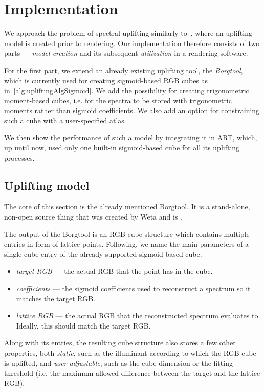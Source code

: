 \chapter{Implementation} \label{chap:implementation}

We approach the problem of spectral uplifting similarly to~\citet{upsamplingJakobHanika}, where an uplifting model is created prior to rendering. Our implementation therefore consists of two parts --- \emph{model creation} and its subsequent \emph{utilization} in a rendering software. 

For the first part, we extend an already existing uplifting tool, the \emph{Borgtool}, which is currently used for creating sigmoid-based RGB cubes as in~\cref{alg:upliftingAlgSigmoid}. We add the possibility for creating trigonometric moment-based cubes, i.e. for the spectra to be stored with trigonometric moments rather than sigmoid coefficients. We also add an option for constraining such a cube with a user-specified atlas.

We then show the performance of such a model by integrating it in ART, which, up until now, used only one built-in sigmoid-based cube for all its uplifting processes.

\section{Uplifting model}

The core of this section is the already mentioned Borgtool. It is a stand-alone, non-open source thing that was created by Weta and is .

The output of the Borgtool is an RGB cube structure which contains multiple entries in form of lattice points. Following, we name the main parameters of a single cube entry of the already supported sigmoid-based cube:
\begin{itemize}
	\item \emph{target RGB} --- the actual RGB that the point has in the cube.
	\item \emph{coefficients} --- the sigmoid coefficients used to reconstruct a spectrum so it matches the target RGB.
	\item \emph{lattice RGB} --- the actual RGB that the reconstructed spectrum evaluates to. Ideally, this should match the target RGB.
\end{itemize}
Along with its entries, the resulting cube structure also stores a few other properties, both \emph{static}, such as the illuminant according to which the RGB cube is uplifted, and \emph{user-adjustable}, such as the cube dimension or the fitting threshold (i.e. the maximum allowed difference between the target and the lattice RGB).

